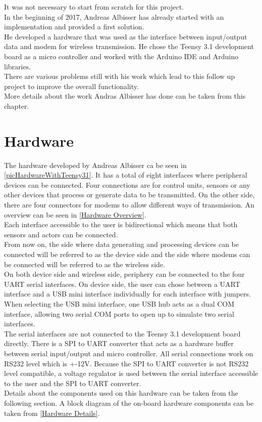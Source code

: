 %
%
It was not necessary to start from scratch for this project. \\
In the beginning of 2017, Andreas Albisser has already started with an implementation and provided a first solution. \\
He developed a hardware that was used as the interface between input/output data and modem for wireless transmission. He chose the Teensy 3.1 development board as a micro controller and worked with the Arduino IDE and Arduino libraries. \\
There are various problems still with his work which lead to this follow up project to improve the overall functionality.\\
More details about the work Andras Albisser has done can be taken from this chapter. \\
%
%
%
\section{Hardware}
%
The hardware developed by Andreas Albisser ca be seen in \autoref{picHardwareWithTeensy31}. It has a total of eight interfaces where peripheral devices can be connected. Four connections are for control units, sensors or any other devices that process or generate data to be transmitted. On the other side, there are four connectors for modems to allow different ways of transmission. An overview can be seen in \autoref{Hardware Overview}.\\
%
Each interface accessible to the user is bidirectional which means that both sensors and actors can be connected.\\
From now on, the side where data generating and processing devices can be connected will be referred to as the device side and the side where modems can be connected will be referred to as the wireless side.\\
On both device side and wireless side, periphery can be connected to the four UART serial interfaces. On device side, the user can chose between a UART interface and a USB mini interface individually for each interface with jumpers. When selecting the USB mini interface, one USB hub acts as a dual COM interface, allowing two serial COM ports to open up to simulate two serial interfaces. \\
The serial interfaces are not connected to the Teensy 3.1 development board directly. There is a SPI to UART converter that acts as a hardware buffer between serial input/output and micro controller.
All serial connections work on RS232 level which is +-12V. Because the SPI to UART converter is not RS232 level compatible, a voltage regulator is used between the serial interface accessible to the user and the SPI to UART converter.\\
Details about the components used on this hardware can be taken from the following section.
A block diagram of the on-board hardware components can be taken from \autoref{Hardware Details}.\\
%
%
